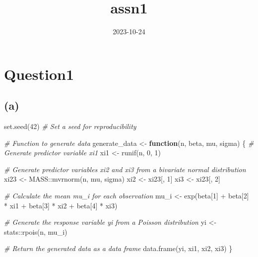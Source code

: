 \documentclass[
]{article}
\title{assn1}
\author{}
\date{\vspace{-2.5em}2023-10-24}
\newenvironment{Shaded}{\begin{snugshade}}{\end{snugshade}}
\newcommand{\CommentTok}[1]{\textcolor[rgb]{0.56,0.35,0.01}{\textit{#1}}}
\newcommand{\ControlFlowTok}[1]{\textcolor[rgb]{0.13,0.29,0.53}{\textbf{#1}}}
\newcommand{\DecValTok}[1]{\textcolor[rgb]{0.00,0.00,0.81}{#1}}
\newcommand{\FunctionTok}[1]{\textcolor[rgb]{0.00,0.00,0.00}{#1}}
\newcommand{\NormalTok}[1]{#1}
\newcommand{\OtherTok}[1]{\textcolor[rgb]{0.56,0.35,0.01}{#1}}
\newcommand{\SpecialCharTok}[1]{\textcolor[rgb]{0.00,0.00,0.00}{#1}}
\begin{document}
\maketitle

\hypertarget{question1}{%
\section{Question1}\label{question1}}

\hypertarget{a}{%
\subsection{(a)}\label{a}}

\begin{Shaded}
\begin{Highlighting}[]
\FunctionTok{set.seed}\NormalTok{(}\DecValTok{42}\NormalTok{)  }\CommentTok{\# Set a seed for reproducibility}

\CommentTok{\# Function to generate data}
\NormalTok{generate\_data }\OtherTok{\textless{}{-}} \ControlFlowTok{function}\NormalTok{(n, beta, mu, sigma) \{}
  \CommentTok{\# Generate predictor variable xi1}
\NormalTok{  xi1 }\OtherTok{\textless{}{-}} \FunctionTok{runif}\NormalTok{(n, }\DecValTok{0}\NormalTok{, }\DecValTok{1}\NormalTok{)}
  
  \CommentTok{\# Generate predictor variables xi2 and xi3 from a bivariate normal distribution}
\NormalTok{  xi23 }\OtherTok{\textless{}{-}}\NormalTok{ MASS}\SpecialCharTok{::}\FunctionTok{mvrnorm}\NormalTok{(n, mu, sigma)}
\NormalTok{  xi2 }\OtherTok{\textless{}{-}}\NormalTok{ xi23[, }\DecValTok{1}\NormalTok{]}
\NormalTok{  xi3 }\OtherTok{\textless{}{-}}\NormalTok{ xi23[, }\DecValTok{2}\NormalTok{]}
  
  \CommentTok{\# Calculate the mean mu\_i for each observation}
\NormalTok{  mu\_i }\OtherTok{\textless{}{-}} \FunctionTok{exp}\NormalTok{(beta[}\DecValTok{1}\NormalTok{] }\SpecialCharTok{+}\NormalTok{ beta[}\DecValTok{2}\NormalTok{] }\SpecialCharTok{*}\NormalTok{ xi1 }\SpecialCharTok{+}\NormalTok{ beta[}\DecValTok{3}\NormalTok{] }\SpecialCharTok{*}\NormalTok{ xi2 }\SpecialCharTok{+}\NormalTok{ beta[}\DecValTok{4}\NormalTok{] }\SpecialCharTok{*}\NormalTok{ xi3)}
  
  \CommentTok{\# Generate the response variable yi from a Poisson distribution}
\NormalTok{  yi }\OtherTok{\textless{}{-}}\NormalTok{ stats}\SpecialCharTok{::}\FunctionTok{rpois}\NormalTok{(n, mu\_i)}
  
  \CommentTok{\# Return the generated data as a data frame}
  \FunctionTok{data.frame}\NormalTok{(yi, xi1, xi2, xi3)}
\NormalTok{\}}
\end{Highlighting}
\end{Shaded}
\end{document}
